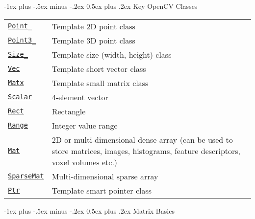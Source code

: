 \documentclass[10pt,landscape]{article}
\makeatletter
\renewcommand{\section}{\@startsection{section}{1}{0mm}%
                                {-1ex plus -.5ex minus -.2ex}%
                                {0.5ex plus .2ex}%
                                {\normalfont\large\bfseries}}
\makeatother
\begin{document}
\begin{multicols}{3}
\section{Key OpenCV Classes}
\begin{tabular}{@{}p{\the\MyLen}%
                @{}p{\linewidth-\the\MyLen}@{}}
\texttt{\href{http://opencv.willowgarage.com/documentation/cpp/core_basic_structures.html\#point}{Point\_}} & Template 2D point class \\
\texttt{\href{http://opencv.willowgarage.com/documentation/cpp/core_basic_structures.html\#point3}{Point3\_}} & Template 3D point class \\
\texttt{\href{http://opencv.willowgarage.com/documentation/cpp/core_basic_structures.html\#size}{Size\_}} & Template size (width, height) class \\
\texttt{\href{http://opencv.willowgarage.com/documentation/cpp/core_basic_structures.html\#vec}{Vec}} & Template short vector class \\
\texttt{\href{http://opencv.willowgarage.com/documentation/cpp/core_basic_structures.html\#vec}{Matx}} & Template small matrix class \\
\texttt{\href{http://opencv.willowgarage.com/documentation/cpp/core_basic_structures.html\#scalar}{Scalar}} & 4-element vector \\
\texttt{\href{http://opencv.willowgarage.com/documentation/cpp/core_basic_structures.html\#rect}{Rect}} & Rectangle \\
\texttt{\href{http://opencv.willowgarage.com/documentation/cpp/core_basic_structures.html\#range}{Range}} & Integer value range \\
\texttt{\href{http://opencv.willowgarage.com/documentation/cpp/core_basic_structures.html\#mat}{Mat}} & 2D or multi-dimensional dense array (can be used to store matrices, images, histograms, feature descriptors, voxel volumes etc.)\\
\texttt{\href{http://opencv.willowgarage.com/documentation/cpp/core_basic_structures.html\#sparsemat}{SparseMat}} & Multi-dimensional sparse array \\
\texttt{\href{http://opencv.willowgarage.com/documentation/cpp/core_basic_structures.html\#ptr}{Ptr}} & Template smart pointer class
\end{tabular}

\section{Matrix Basics}
\begin{tabbing}


\end{tabbing}
\end{multicols}
\end{document}
